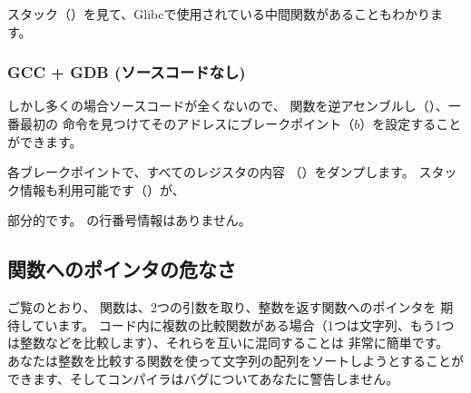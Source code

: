 スタック（）を見て、Glibcで使用されている中間関数があることもわかります。



\subsubsection{GCC + GDB (ソースコードなし)}

しかし多くの場合ソースコードが全くないので、 \comp 関数を逆アセンブルし（）、一番最初の
\CMP 命令を見つけてそのアドレスにブレークポイント（$b$）を設定することができます。

各ブレークポイントで、すべてのレジスタの内容
（）をダンプします。 
スタック情報も利用可能です（）が、

部分的です。 \comp の行番号情報はありません。



\subsection{関数へのポインタの危なさ}

ご覧のとおり、 \qsort 関数は、2つの引数を取り、整数を返す関数へのポインタを
期待しています。 
コード内に複数の比較関数がある場合（1つは文字列、もう1つは整数などを比較します）、それらを互いに混同することは
非常に簡単です。 
あなたは整数を比較する関数を使って文字列の配列をソートしようとすることができます、そしてコンパイラはバグについてあなたに警告しません。
